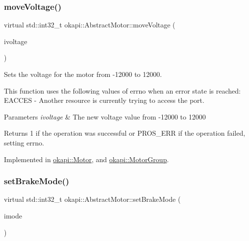 \subsubsection{\texorpdfstring{moveVoltage()}{moveVoltage()}}
{\footnotesize\ttfamily virtual std\+::int32\+\_\+t okapi\+::\+Abstract\+Motor\+::move\+Voltage (\begin{DoxyParamCaption}\item[{std\+::int16\+\_\+t}]{ivoltage }\end{DoxyParamCaption})\hspace{0.3cm}{\ttfamily [pure virtual]}}

Sets the voltage for the motor from -\/12000 to 12000.

This function uses the following values of errno when an error state is reached\+: E\+A\+C\+C\+ES -\/ Another resource is currently trying to access the port.


\begin{DoxyParams}{Parameters}
{\em ivoltage} & The new voltage value from -\/12000 to 12000 \\
\hline
\end{DoxyParams}
\begin{DoxyReturn}{Returns}
1 if the operation was successful or P\+R\+O\+S\+\_\+\+E\+RR if the operation failed, setting errno. 
\end{DoxyReturn}


Implemented in \mbox{\hyperlink{classokapi_1_1Motor_a64b53a041c90c7b7a3903c607a9b17eb}{okapi\+::\+Motor}}, and \mbox{\hyperlink{classokapi_1_1MotorGroup_acebebe160f2c733ee497b1b8b50b0781}{okapi\+::\+Motor\+Group}}.

\mbox{\label{classokapi_1_1AbstractMotor_af7bb7d0d895c89d6b193f500587a818b}} 
\subsubsection{\texorpdfstring{setBrakeMode()}{setBrakeMode()}}
{\footnotesize\ttfamily virtual std\+::int32\+\_\+t okapi\+::\+Abstract\+Motor\+::set\+Brake\+Mode (\begin{DoxyParamCaption}\item[{\mbox{\hyperlink{classokapi_1_1AbstractMotor_a132e0485dbb59a60c3f934338d8fa601}{brake\+Mode}}}]{imode }\end{DoxyParamCaption})\hspace{0.3cm}{\ttfamily [pure virtual]}}

